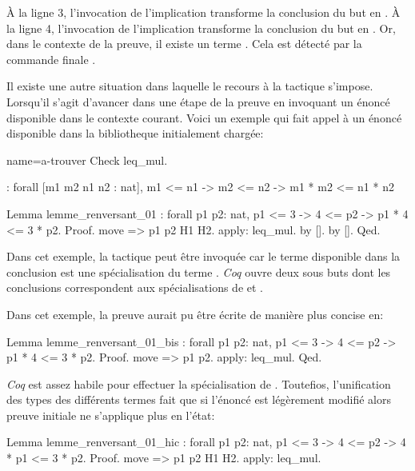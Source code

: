 \documentclass[a4paper,10pt]{article}
\begin{document}
À la ligne 3, l'invocation de l'implication  transforme la conclusion du but en .
À la ligne 4, l'invocation de l'implication  transforme la conclusion du but en . Or,
dans le contexte de la preuve, il existe un terme .  Cela est détecté par la commande finale
.

Il existe une autre situation dans laquelle le recours à la tactique  s'impose.  Lorsqu'il s'agit
d'avancer dans une étape de la preuve en invoquant un énoncé disponible dans le contexte courant.  Voici un
exemple qui fait appel à un énoncé disponible dans la bibliotheque initialement chargée:

\begin{coq-left}{name=a-trouver}{}
Check leq_mul.
\end{coq-left}
\hfill
\begin{coqout-right}
: forall [m1 m2 n1 n2 : nat], m1 <= n1 -> m2 <= n2 -> m1 * m2 <= n1 * n2
\end{coqout-right}

\begin{coq}[]
Lemma lemme_renversant_01 : forall p1 p2: nat, p1 <= 3 -> 4 <= p2 -> p1 * 4 <= 3 * p2.
Proof.
  move => p1 p2 H1 H2.
  apply: leq_mul.
  by [].
  by [].
Qed.
\end{coq}

Dans cet exemple, la tactique  peut être invoquée car le terme disponible dans la
conclusion  est une spécialisation du terme .  \emph{Coq}
ouvre deux sous buts dont les conclusions correspondent aux spécialisations de  et .

Dans cet exemple, la preuve aurait pu être écrite de manière plus concise en:

\begin{coq}[]
Lemma lemme_renversant_01_bis : forall p1 p2: nat, p1 <= 3 -> 4 <= p2 -> p1 * 4 <= 3 * p2.
Proof.
  move => p1 p2.
  apply: leq_mul.
Qed.
\end{coq}

\emph{Coq} est assez habile pour effectuer la spécialisation de .
Toutefios, l'unification des types des différents termes fait que si l'énoncé est légèrement modifié alors
preuve initiale ne s'applique plus en l'état:

\begin{coq}[]
Lemma lemme_renversant_01_hic : forall p1 p2: nat, p1 <= 3 -> 4 <= p2 -> 4 * p1 <= 3 * p2.
Proof.
  move => p1 p2 H1 H2.
  apply: leq_mul.
\end{coq}
\end{document}
